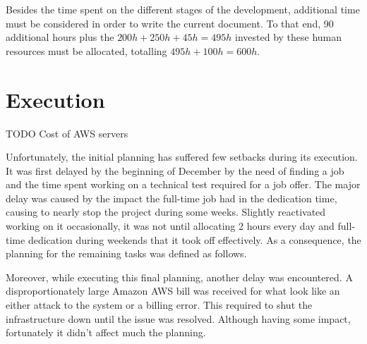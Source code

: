 Besides the time spent on the different stages of the development, additional time must be considered in order to write the current document. To that end, 90 additional hours plus the $200h + 250h + 45h = 495h$ invested by these human resources must be allocated, totalling $495h + 100h = 600h$.

\section{Execution}

TODO Cost of AWS servers

Unfortunately, the initial planning has suffered few setbacks during its execution. It was first delayed by the beginning of December by the need of finding a job and the time spent working on a technical test required for a job offer. The major delay was caused by the impact the full-time job had in the dedication time, causing to nearly stop the project during some weeks. Slightly      reactivated working on it occasionally, it was not until allocating 2 hours every day and full-time dedication during weekends that it took off effectively. As a consequence, the planning for the remaining tasks was defined as follows.

Moreover, while executing this final planning, another delay was encountered. A disproportionately large Amazon AWS bill was received for what look like an either attack to the system or a billing error. This required to shut the infrastructure down until the issue was resolved. Although having some impact, fortunately it didn't affect much the planning.

